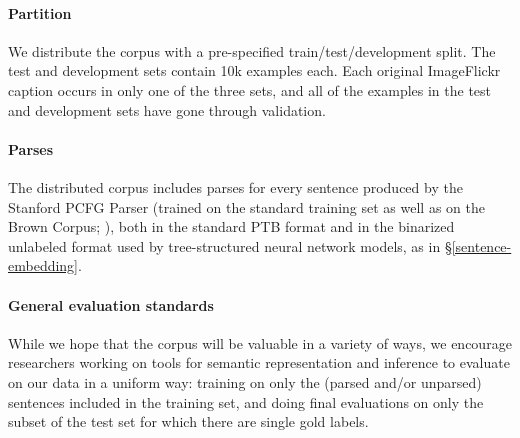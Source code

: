 \paragraph{Partition} We distribute the corpus with a pre-specified train/test/development split. The test and development sets contain 10k examples each. Each original ImageFlickr caption occurs in only one of the three sets, and all of the examples in the test and development sets have gone through validation.


\paragraph{Parses}

The distributed corpus includes parses for every sentence produced by the Stanford PCFG Parser \cite{klein2003accurate} (trained on the standard training set as well as on the Brown Corpus; \citealt{francis1979brown}), both in the standard PTB format and in the binarized unlabeled format used by tree-structured neural network models, as in \S\ref{sentence-embedding}.

\noindent{}

\paragraph{General evaluation standards}
While we hope that the corpus will be valuable in a variety of ways, we encourage researchers working on tools for semantic representation and inference to evaluate on our data in a uniform way: training on only the (parsed and/or unparsed) sentences included in the training set, and doing final evaluations on only the subset of the test set for which there are single gold labels.
